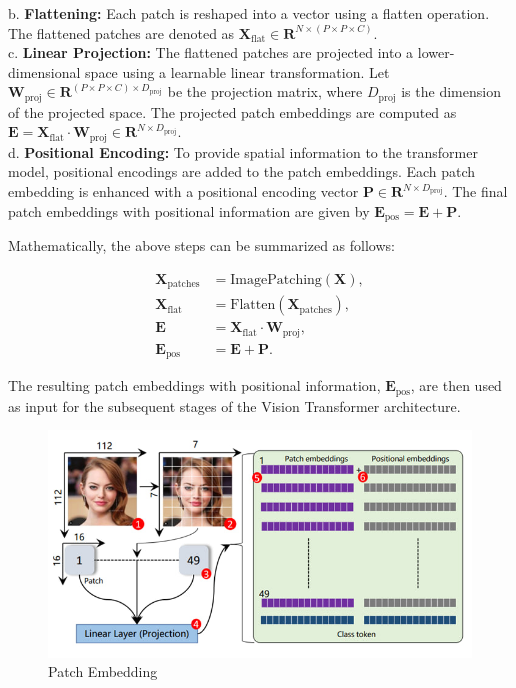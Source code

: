 \noindent b. \textbf{Flattening:} Each patch is reshaped into a vector using a flatten operation. The flattened patches are denoted as $\mathbf{X}_\text{flat} \in \mathbf{R}^{N \times (P \times P \times C)}$.
\\

\noindent c. \textbf{Linear Projection:} The flattened patches are projected into a lower-dimensional space using a learnable linear transformation. Let $\mathbf{W}_\text{proj} \in \mathbf{R}^{(P \times P \times C) \times D_\text{proj}}$ be the projection matrix, where $D_\text{proj}$ is the dimension of the projected space. The projected patch embeddings are computed as $\mathbf{E} = \mathbf{X}_\text{flat} \cdot \mathbf{W}_\text{proj} \in \mathbf{R}^{N \times D_\text{proj}}$.
\\

\noindent d. \textbf{Positional Encoding:} To provide spatial information to the transformer model, positional encodings are added to the patch embeddings. Each patch embedding is enhanced with a positional encoding vector $\mathbf{P} \in \mathbf{R}^{N \times D_\text{proj}}$. The final patch embeddings with positional information are given by $\mathbf{E}_\text{pos} = \mathbf{E} + \mathbf{P}$.

\noindent Mathematically, the above steps can be summarized as follows:

\begin{align}
    \mathbf{X}_\text{patches} & = \text{ImagePatching}(\mathbf{X}),                    \\
    \mathbf{X}_\text{flat}    & = \text{Flatten}(\mathbf{X}_\text{patches}),           \\
    \mathbf{E}                & = \mathbf{X}_\text{flat} \cdot \mathbf{W}_\text{proj}, \\
    \mathbf{E}_\text{pos}     & = \mathbf{E} + \mathbf{P}.
\end{align}

The resulting patch embeddings with positional information, $\mathbf{E}_\text{pos}$, are then used as input for the subsequent stages of the Vision Transformer architecture.


\begin{figure}[htbp]
    \centering
    \includegraphics[width=6in]{img/patchembedding.jpg}
    \caption{{Patch Embedding}}
\end{figure}


